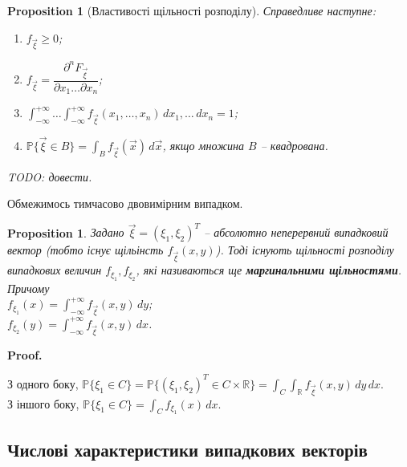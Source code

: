 \documentclass[a4paper, 10pt]{article}
\makeatletter
\theoremstyle{theoremdd}
\newtheorem{proposition}[theorem]{Proposition}
\renewenvironment{proof}[1][Proof.\\]{\par
\pushQED{\hfill \qed}%
\normalfont \topsep6\p@\@plus6\p@\relax
\trivlist
\item\relax
{\bfseries
#1\@addpunct{.}}\hspace\labelsep\ignorespaces
}{%
\popQED\endtrivlist\@endpefalse
}
\makeatother
\begin{document}
\begin{proposition}[Властивості щільності розподілу]
Справедливе наступне:
\begin{enumerate}[nosep,wide=0pt,label={\arabic*)}]
\item $f_{\vec{\xi}} \geq 0$;
\item $f_{\vec{\xi}} = \dfrac{\partial^n F_{\vec{\xi}}}{\partial x_1 \dots \partial x_n}$;
\item $\displaystyle\int_{-\infty}^{+\infty} \dots \int_{-\infty}^{+\infty} f_{\vec{\xi}}(x_1,\dots,x_n)\,dx_1,\dots\,dx_n = 1$;
\item $\mathbb{P}\{\vec{\xi} \in B\} = \displaystyle\int_B f_{\vec{\xi}}(\vec{x})\,d\vec{x}$, якщо множина $B$ -- квадрована.
\end{enumerate}
\textit{TODO: довести.}
\end{proposition}
\noindent Обмежимось тимчасово двовимірним випадком.
\begin{proposition}
Задано $\vec{\xi} = (\xi_1,\xi_2)^T$ -- абсолютно неперервний випадковий вектор (тобто існує щільінсть $f_{\vec{\xi}}(x,y)$). Тоді існують щільності розподілу випадкових величин $f_{\xi_1},f_{\xi_2}$, які називаються ще \textbf{маргинальними щільностями}. Причому\\
$f_{\xi_1}(x) = \displaystyle\int_{-\infty}^{+\infty} f_{\vec{\xi}}(x,y)\,dy$;\\
$f_{\xi_2}(y) = \displaystyle\int_{-\infty}^{+\infty} f_{\vec{\xi}}(x,y)\,dx$.
\end{proposition}

\begin{proof}
З одного боку, $\displaystyle\mathbb{P}\{\xi_1 \in C\} = \mathbb{P}\{ (\xi_1,\xi_2)^T \in C \times \mathbb{R} \} = \int_C \int_{\mathbb{R}} f_{\vec{\xi}}(x,y)\,dy\,dx$.\\
З іншого боку, $\displaystyle\mathbb{P}\{\xi_1 \in C\} = \int_C f_{\xi_1}(x)\,dx$.
\end{proof}

\subsection{Числові характеристики випадкових векторів}
\end{document}
